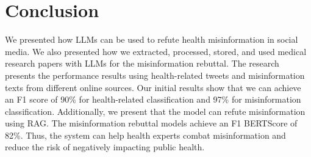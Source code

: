 \section{Conclusion}
We presented how LLMs can be used to refute health misinformation in social media. 
We also presented how we extracted, processed, stored, and used medical research papers with LLMs for the misinformation rebuttal. 
The research presents the performance results using health-related tweets and misinformation texts from different online sources. Our  initial results show that we can achieve an F1 score of 90\% for health-related classification and 97\% for misinformation classification. Additionally, we present that the model can refute misinformation using RAG. The misinformation rebuttal models achieve an F1 BERTScore of 82\%. Thus, the system can help health experts combat misinformation and reduce the risk of negatively impacting public health.

%
